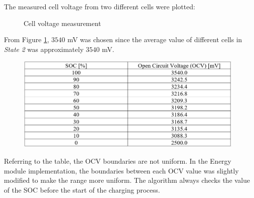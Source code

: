 \documentclass[11pt, a4paper]{article}
\begin{document}
The measured cell voltage from two different cells were plotted: 
\begin{figure}[h!]
    \centering
    \qquad
    \caption{Cell voltage measurement}
    \label{fig:Cell}
\end{figure}


From Figure \ref{fig:Cell}, $3540$ mV was chosen since the average value of different cells in \textit{State 2} was approximately $3540$ mV. 

\begin{figure} [h!]
    \centering
    \includegraphics[scale=0.6]{Energy_SOC.JPG}
\end{figure}

Referring to the table, the OCV boundaries are not uniform. In the Energy module implementation, the boundaries between each OCV value was slightly modified to make the range more uniform. The algorithm always checks the value of the SOC before the start of the charging process.
\end{document}
